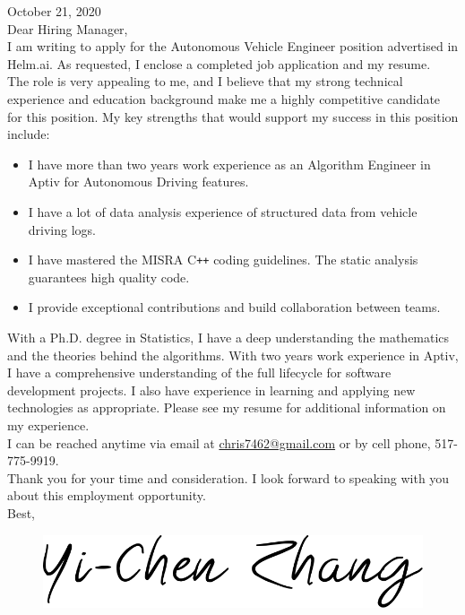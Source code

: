 \documentclass[a4paper,12pt,dvipdfmx]{article}
\begin{document}
\noindent October 21, 2020\\

\noindent Dear Hiring Manager,\\

\noindent I am writing to apply for the Autonomous Vehicle Engineer position advertised in Helm.ai. As requested, I enclose a completed job application and my resume.\\

\noindent The role is very appealing to me, and I believe that my strong technical experience and education background make me a highly competitive candidate for this position. My key strengths that would support my success in this position include:

\begin{itemize}
  \item I have more than two years work experience as an Algorithm Engineer in Aptiv for Autonomous Driving features.
  \item I have a lot of data analysis experience of structured data from vehicle driving logs.
  \item I have mastered the MISRA \textsf{C}\texttt{++} coding guidelines. The static analysis guarantees high quality code.
  \item I provide exceptional contributions and build collaboration between teams.
\end{itemize}

\noindent With a Ph.D. degree in Statistics, I have a deep understanding the mathematics and the theories behind the algorithms. With two years work experience in Aptiv, I have a comprehensive understanding of the full lifecycle for software development projects. I also have experience in learning and applying new technologies as appropriate. Please see my resume for additional information on my experience.\\

\noindent I can be reached anytime via email at \href{mailto:chris7462@gmail.com}{chris7462@gmail.com} or by cell phone, 517-775-9919.\\

\noindent Thank you for your time and consideration. I look forward to speaking with you about this employment opportunity.\\

\noindent Best,

\begin{figure}[!ht]
  \includegraphics[scale=0.12]{./Signature.png}
\end{figure}
\end{document}
